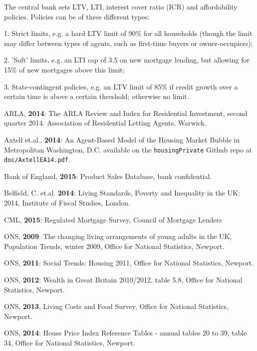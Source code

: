 \documentclass{report}
\begin{document}
The central bank sets LTV, LTI, interest cover ratio (ICR) and affordability
policies. Policies can be of three different types:

1. Strict limits, e.g. a hard LTV limit of 90\% for all households (though
the limit may differ between types of agents, such as first-time buyers or
owner-occupiers);

2. 'Soft' limits, e.g. an LTI cap of 3.5 on new mortgage lending, but
allowing for 15\% of new mortgages above this limit;

3. State-contingent policies, e.g. an LTV limit of 85\% if credit growth
over a certain time is above a certain threshold; otherwise no limit.


\appendix
\begin{thebibliography}{20}

 ARLA, \textbf{2014}: The ARLA Review and Index for Residential Investment, second quarter 2014. Association of Residential Letting Agents, Warwick.

 Axtell et.al., \textbf{2014}: An Agent-Based Model of the Housing Market Bubble in Metropolitan Washington, D.C. available on the \texttt{housingPrivate} Github repo at \texttt{doc/AxtellEA14.pdf}.

 Bank of England, \textbf{2015}: Product Sales Database, bank confidential.

 Belfield, C. et.al. \textbf{2014}: Living Standards, Poverty and Inequality in the UK: 2014, Institute of Fiscal Studies, London.

 CML, \textbf{2015}: Regulated Mortgage Survey, Council of Mortgage Lenders

 ONS, \textbf{2009}: The changing living arrangements of young adults in the UK, Population Trends, winter 2009, Office for National Statistics, Newport.

 ONS, \textbf{2011}: Social Trends: Housing 2011, Office for National Statistics, Newport.

 ONS, \textbf{2012}: Wealth in Great Britain 2010/2012, table 5.8, Office for National Statistics, Newport.

 ONS, \textbf{2013}, Living Costs and Food Survey, Office for National Statistics, Newport.

 ONS, \textbf{2014}: House Price Index Reference Tables - annual tables 20 to 39, table 34, Office for National Statistics, Newport.

\end{thebibliography}
\end{document}
